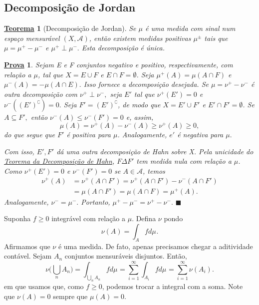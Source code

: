 \documentclass{article}
\newtheorem*{theorem*}{\underline{Teorema}}
\newtheorem*{proof*}{\underline{Prova}}
\renewcommand\qedsymbol{$\blacksquare$}
\begin{document}
\subsection{Decomposição de Jordan}
 \hypertarget{jordan_decomposition}{
   \begin{theorem*}[Decomposição de Jordan]
  Se \(\mu \) é uma medida com sinal num espaço mensurável \((X, \mathcal{A})\), então existem medidas positivas \(\mu ^{\pm}\) tais que \(\mu = \mu ^{+} - \mu ^{-}\) e \(\mu ^{+}\perp \mu ^{-}.\) Esta decomposição é única.
\end{theorem*}}
\begin{proof*}
  Sejam E e F conjuntos negativo e positivo, respectivamente, com relação a \(\mu \), tal que \(X = E\cup F\) e \(E\cap F = \emptyset \). Seja \(\mu ^{+}(A) = \mu (A\cap F)\) e \(\mu ^{-}(A)=-\mu (A\cap E).\) Isso 
  fornece a decomposição desejada. Se \(\mu = \nu^{+}-\nu^{-}\) é outra decomposição com \(\nu^{+}\perp \nu^{-},\) seja \(E'\) tal que \(\nu^{+}(E') = 0\) e 
  \(\nu^{-}((E')^{\complement}) = 0.\) Seja \(F'=(E')^{\complement}\), de modo que \(X = E' \cup F'\) e \(E'\cap F' = \emptyset \). Se \(A\subseteq F',\) então \(\nu^{-}(A)\leq \nu^{-}(F') = 0\) e, assim,
    \[
      \mu (A) = \nu ^{+}(A) - \nu ^{-}(A) \geq \nu ^{+}(A) \geq 0,
    \]
  do que segue que \(F'\) é positiva para \(\mu \). Analogamente, \(e'\) é negativa para \(\mu .\) 

  Com isso, \(E', F'\) dá uma outra decomposição de Hahn sobre X. Pela unicidade do \hyperlink{hahn}{\textit{Teorema da Decomposição de Hahn}}, \(F\Delta F'\) tem medida nula com relação a \(\mu \). Como \(\nu ^{+}(E') = 0\) e \(\nu^{-}(F') = 0\)
se \(A\in \mathcal{A}\), temos 
 \begin{align*}
   \nu ^{+}(A) &= \nu ^{+}(A\cap F') = \nu ^{+}(A\cap F') - \nu ^{-}(A\cap F')\\ 
               &= \mu (A\cap F') = \mu (A\cap F) = \mu ^{+}(A).
 \end{align*}
 Analogamente, \(\nu^{-}=\mu ^{-}.\) Portanto, \(\mu^{+}-\mu ^{-}= \nu^{+}-\nu ^{-}. \) \qedsymbol
\end{proof*}
   Suponha \(f\geq 0\) integrável com relação a \(\mu \). Defina \(\nu \) pondo 
     \[
       \nu (A) = \int_{A}f d\mu_{}.
     \]
    Afirmamos que \(\nu \) é uma medida. De fato, apenas precisamos chegar a aditividade contável. Sejam \(A_{n}\) conjuntos mensuráveis disjuntos. Então,
      \[
        \nu \biggl(\bigcup_{n}^{}A_{n}\biggr) = \int_{\bigcup_{n}^{}A_{n}}f d\mu_{} = \sum\limits_{i=1}^{\infty}\int_{A_{i}}f d\mu_{} = \sum\limits_{i=1}^{\infty}\nu (A_{i}).
      \]
    em que usamos que, como \(f\geq 0\), podemos trocar a integral com a soma. Note que \(\nu (A) = 0\) sempre que \(\mu (A) = 0\). 
\end{document}
